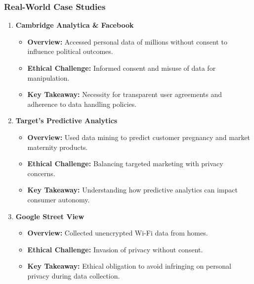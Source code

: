 \documentclass[aspectratio=169]{beamer}
\begin{document}
\begin{frame}[fragile]
    \frametitle{Real-World Case Studies}

    \begin{enumerate}
        \item \textbf{Cambridge Analytica \& Facebook}
            \begin{itemize}
                \item \textbf{Overview:} Accessed personal data of millions without consent to influence political outcomes.
                \item \textbf{Ethical Challenge:} Informed consent and misuse of data for manipulation.
                \item \textbf{Key Takeaway:} Necessity for transparent user agreements and adherence to data handling policies.
            \end{itemize}
        
        \item \textbf{Target’s Predictive Analytics}
            \begin{itemize}
                \item \textbf{Overview:} Used data mining to predict customer pregnancy and market maternity products.
                \item \textbf{Ethical Challenge:} Balancing targeted marketing with privacy concerns.
                \item \textbf{Key Takeaway:} Understanding how predictive analytics can impact consumer autonomy.
            \end{itemize}
        
        \item \textbf{Google Street View}
            \begin{itemize}
                \item \textbf{Overview:} Collected unencrypted Wi-Fi data from homes.
                \item \textbf{Ethical Challenge:} Invasion of privacy without consent.
                \item \textbf{Key Takeaway:} Ethical obligation to avoid infringing on personal privacy during data collection.
            \end{itemize}
    \end{enumerate}
\end{frame}
\end{document}
